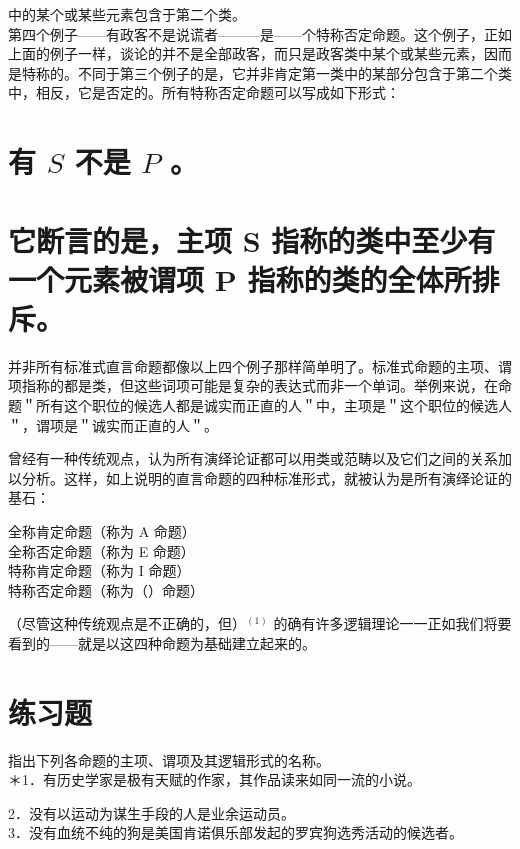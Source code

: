 中的某个或某些元素包含于第二个类。\\
第四个例子——有政客不是说谎者———是——个特称否定命题。这个例子，正如上面的例子一样，谈论的并不是全部政客，而只是政客类中某个或某些元素，因而是特称的。不同于第三个例子的是，它并非肯定第一类中的某部分包含于第二个类中，相反，它是否定的。所有特称否定命题可以写成如下形式：

\section*{有 $S$ 不是 $P$ 。}
\section*{它断言的是，主项 $\boldsymbol{S}$ 指称的类中至少有一个元素被谓项 $\boldsymbol{P}$ 指称的类的全体所排斥。}
并非所有标准式直言命题都像以上四个例子那样简单明了。标准式命题的主项、谓项指称的都是类，但这些词项可能是复杂的表达式而非一个单词。举例来说，在命题＂所有这个职位的候选人都是诚实而正直的人＂中，主项是＂这个职位的候选人＂，谓项是＂诚实而正直的人＂。

曾经有一种传统观点，认为所有演绎论证都可以用类或范畴以及它们之间的关系加以分析。这样，如上说明的直言命题的四种标准形式，就被认为是所有演绎论证的基石：

\begin{displayquote}
全称肯定命题（称为 A 命题）\\
全称否定命题（称为 E 命题）\\
特称肯定命题（称为 I 命题）\\
特称否定命题（称为（）命题）
\end{displayquote}

（尽管这种传统观点是不正确的，但）${ }^{(1)}$ 的确有许多逻辑理论一一正如我们将要看到的——就是以这四种命题为基础建立起来的。

\section*{练习题}
指出下列各命题的主项、谓项及其逻辑形式的名称。\\
＊1．有历史学家是极有天赋的作家，其作品读来如同一流的小说。

2．没有以运动为谋生手段的人是业余运动员。\\
3．没有血统不纯的狗是美国肯诺俱乐部发起的罗宾狗选秀活动的候选者。

